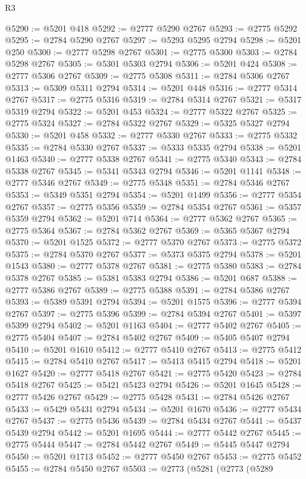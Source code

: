 \begin{lexlean}{R3}
\begin{coremodule}
@5290 := @5201 @418
@5292 := @2777 @5290 @2767
@5293 := @2775 @5292
@5295 := @2784 @5290 @2767
@5297 := @5293 @5295 @2794
@5298 := @5201 @250
@5300 := @2777 @5298 @2767
@5301 := @2775 @5300
@5303 := @2784 @5298 @2767
@5305 := @5301 @5303 @2794
@5306 := @5201 @424
@5308 := @2777 @5306 @2767
@5309 := @2775 @5308
@5311 := @2784 @5306 @2767
@5313 := @5309 @5311 @2794
@5314 := @5201 @448
@5316 := @2777 @5314 @2767
@5317 := @2775 @5316
@5319 := @2784 @5314 @2767
@5321 := @5317 @5319 @2794
@5322 := @5201 @453
@5324 := @2777 @5322 @2767
@5325 := @2775 @5324
@5327 := @2784 @5322 @2767
@5329 := @5325 @5327 @2794
@5330 := @5201 @458
@5332 := @2777 @5330 @2767
@5333 := @2775 @5332
@5335 := @2784 @5330 @2767
@5337 := @5333 @5335 @2794
@5338 := @5201 @1463
@5340 := @2777 @5338 @2767
@5341 := @2775 @5340
@5343 := @2784 @5338 @2767
@5345 := @5341 @5343 @2794
@5346 := @5201 @1141
@5348 := @2777 @5346 @2767
@5349 := @2775 @5348
@5351 := @2784 @5346 @2767
@5353 := @5349 @5351 @2794
@5354 := @5201 @1499
@5356 := @2777 @5354 @2767
@5357 := @2775 @5356
@5359 := @2784 @5354 @2767
@5361 := @5357 @5359 @2794
@5362 := @5201 @714
@5364 := @2777 @5362 @2767
@5365 := @2775 @5364
@5367 := @2784 @5362 @2767
@5369 := @5365 @5367 @2794
@5370 := @5201 @1525
@5372 := @2777 @5370 @2767
@5373 := @2775 @5372
@5375 := @2784 @5370 @2767
@5377 := @5373 @5375 @2794
@5378 := @5201 @1543
@5380 := @2777 @5378 @2767
@5381 := @2775 @5380
@5383 := @2784 @5378 @2767
@5385 := @5381 @5383 @2794
@5386 := @5201 @687
@5388 := @2777 @5386 @2767
@5389 := @2775 @5388
@5391 := @2784 @5386 @2767
@5393 := @5389 @5391 @2794
@5394 := @5201 @1575
@5396 := @2777 @5394 @2767
@5397 := @2775 @5396
@5399 := @2784 @5394 @2767
@5401 := @5397 @5399 @2794
@5402 := @5201 @1163
@5404 := @2777 @5402 @2767
@5405 := @2775 @5404
@5407 := @2784 @5402 @2767
@5409 := @5405 @5407 @2794
@5410 := @5201 @1610
@5412 := @2777 @5410 @2767
@5413 := @2775 @5412
@5415 := @2784 @5410 @2767
@5417 := @5413 @5415 @2794
@5418 := @5201 @1627
@5420 := @2777 @5418 @2767
@5421 := @2775 @5420
@5423 := @2784 @5418 @2767
@5425 := @5421 @5423 @2794
@5426 := @5201 @1645
@5428 := @2777 @5426 @2767
@5429 := @2775 @5428
@5431 := @2784 @5426 @2767
@5433 := @5429 @5431 @2794
@5434 := @5201 @1670
@5436 := @2777 @5434 @2767
@5437 := @2775 @5436
@5439 := @2784 @5434 @2767
@5441 := @5437 @5439 @2794
@5442 := @5201 @1695
@5444 := @2777 @5442 @2767
@5445 := @2775 @5444
@5447 := @2784 @5442 @2767
@5449 := @5445 @5447 @2794
@5450 := @5201 @1713
@5452 := @2777 @5450 @2767
@5453 := @2775 @5452
@5455 := @2784 @5450 @2767
@5503 := @2773
    (@5281
      (@2773
        (@5289

\end{coremodule}
\end{lexlean}
